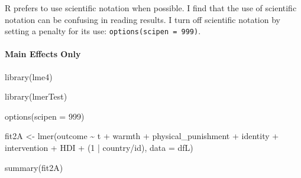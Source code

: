\documentclass[
  letterpaper,
  DIV=11,
  numbers=noendperiod]{scrreprt}
\let\oldparagraph\paragraph
\renewcommand{\paragraph}[1]{\oldparagraph{#1}\mbox{}}
\newenvironment{Shaded}{\begin{snugshade}}{\end{snugshade}}
\newcommand{\AttributeTok}[1]{\textcolor[rgb]{0.40,0.45,0.13}{#1}}
\newcommand{\DecValTok}[1]{\textcolor[rgb]{0.68,0.00,0.00}{#1}}
\newcommand{\FunctionTok}[1]{\textcolor[rgb]{0.28,0.35,0.67}{#1}}
\newcommand{\NormalTok}[1]{\textcolor[rgb]{0.00,0.23,0.31}{#1}}
\newcommand{\OtherTok}[1]{\textcolor[rgb]{0.00,0.23,0.31}{#1}}
\newcommand{\SpecialCharTok}[1]{\textcolor[rgb]{0.37,0.37,0.37}{#1}}
\begin{document}
\begin{tcolorbox}[enhanced jigsaw, colframe=quarto-callout-tip-color-frame, bottomrule=.15mm, opacitybacktitle=0.6, bottomtitle=1mm, toptitle=1mm, colbacktitle=quarto-callout-tip-color!10!white, arc=.35mm, toprule=.15mm, opacityback=0, rightrule=.15mm, title=\textcolor{quarto-callout-tip-color}{\faLightbulb}\hspace{0.5em}{Tip}, leftrule=.75mm, colback=white, breakable, coltitle=black, left=2mm, titlerule=0mm]

R prefers to use scientific notation when possible. I find that the use
of scientific notation can be confusing in reading results. I turn off
scientific notation by setting a penalty for its use:
\texttt{options(scipen\ =\ 999)}.

\end{tcolorbox}

\paragraph{Main Effects Only}\label{main-effects-only-1}

\begin{Shaded}
\begin{Highlighting}[]
\FunctionTok{library}\NormalTok{(lme4) }

\FunctionTok{library}\NormalTok{(lmerTest)}

\FunctionTok{options}\NormalTok{(}\AttributeTok{scipen =} \DecValTok{999}\NormalTok{) }

\NormalTok{fit2A }\OtherTok{\textless{}{-}} \FunctionTok{lmer}\NormalTok{(outcome }\SpecialCharTok{\textasciitilde{}}\NormalTok{ t }\SpecialCharTok{+}\NormalTok{ warmth }\SpecialCharTok{+}\NormalTok{ physical\_punishment }\SpecialCharTok{+} 
\NormalTok{               identity }\SpecialCharTok{+}\NormalTok{ intervention }\SpecialCharTok{+}\NormalTok{ HDI }\SpecialCharTok{+}
\NormalTok{               (}\DecValTok{1} \SpecialCharTok{|}\NormalTok{ country}\SpecialCharTok{/}\NormalTok{id),}
             \AttributeTok{data =}\NormalTok{ dfL)}

\FunctionTok{summary}\NormalTok{(fit2A)}
\end{Highlighting}
\end{Shaded}
\end{document}
